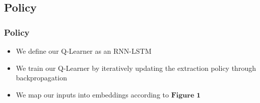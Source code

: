 \documentclass[]{beamer}
\begin{document}

	\subsection{Policy}
	\begin{frame}
			\frametitle{Policy}
			\begin{itemize}
				\item<1-> We define our Q-Learner as an RNN-LSTM 
				\item<1->We train our Q-Learner by iteratively updating the extraction policy through backpropagation
				\item<1-> We map our inputs into embeddings according to $\textbf{Figure 1}$
			\end{itemize}
	\end{frame}
\end{document}
